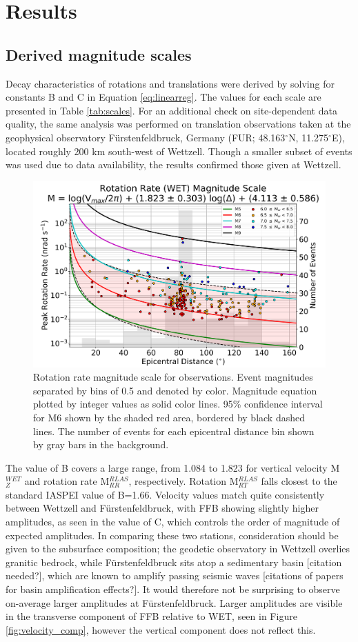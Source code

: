 \documentclass{gji}
\begin{document}
\section{Results}\label{sec:results}
\subsection{Derived magnitude scales}
Decay characteristics of rotations and translations were derived by solving for constants B and C in Equation \ref{eq:linearreg}. The values for each scale are presented in Table \ref{tab:scales}. For an additional check on site-dependent data quality, the same analysis was performed on translation observations taken at the geophysical observatory F\"urstenfeldbruck, Germany (FUR; 48.163$^\circ$N, 11.275$^\circ$E), located roughly 200 km south-west of Wettzell. Though a smaller subset of events was used due to data availability, the results confirmed those given at Wettzell. 


\begin{figure}
\centerline{\includegraphics[width=.8\textwidth]{RR_WET}}
\caption{Rotation rate magnitude scale for observations. Event magnitudes separated by bins of 0.5 and denoted by color. Magnitude equation plotted by integer values as solid color lines. 95\% confidence interval for M6 shown by the shaded red area, bordered by black dashed lines. The number of events for each epicentral distance bin shown by gray bars in the background.}
\label{fig:rr_obs}
\end{figure}

The value of B covers a large range, from 1.084 to 1.823 for vertical velocity M$^{WET}_{Z}$ and rotation rate M$^{RLAS}_{RR}$, respectively. Rotation M$^{RLAS}_{RT}$ falls closest to the standard IASPEI value of B=1.66. Velocity values match quite consistently between Wettzell and F\"urstenfeldbruck, with FFB showing slightly higher amplitudes, as seen in the value of C, which controls the order of magnitude of expected amplitudes. In comparing these two stations, consideration should be given to the subsurface composition; the geodetic observatory in Wettzell overlies granitic bedrock, while F\"urstenfeldbruck sits atop a sedimentary basin [citation needed?], which are known to amplify passing seismic waves [citations of papers for basin amplification effects?]. It would therefore not be surprising to observe on-average larger amplitudes at F\"urstenfeldbruck. Larger amplitudes are visible in the transverse component of FFB relative to WET, seen in Figure \ref{fig:velocity_comp}, however the vertical component does not reflect this. 
\end{document}
